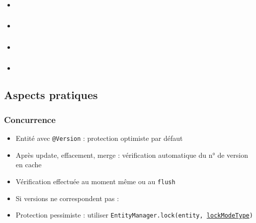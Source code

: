 \documentclass[english, french]{beamer}
\begin{document}
\begin{frame}
	\frametitle{}
	\begin{itemize}
		\item 
	\end{itemize}
	\begin{block}{}
		
	\end{block}
\end{frame}

\begin{frame}
	\frametitle{}
	\begin{itemize}
		\item 
	\end{itemize}
	\begin{block}{}
		
	\end{block}
\end{frame}

\begin{frame}
	\frametitle{}
	\begin{itemize}
		\item 
	\end{itemize}
	\begin{block}{}
		
	\end{block}
\end{frame}

\begin{frame}
	\frametitle{}
	\begin{itemize}
		\item 
	\end{itemize}
	\begin{block}{}
		
	\end{block}
\end{frame}

\subsection{Aspects pratiques}
\begin{frame}
	\frametitle{Concurrence}
	\begin{itemize}
		\item Entité avec \texttt{@Version} : protection optimiste par défaut
		\item Après update, effacement, merge : vérification automatique du n° de version en cache
		\item Vérification effectuée au moment même ou au \texttt{flush}
		\item Si versions ne correspondent pas : 
		\item Protection pessimiste : utiliser \texttt{EntityManager.lock(entity, \href{https://docs.oracle.com/javaee/7/api/javax/persistence/LockModeType.html}{lockModeType})}
	\end{itemize}
\end{frame}
\end{document}
